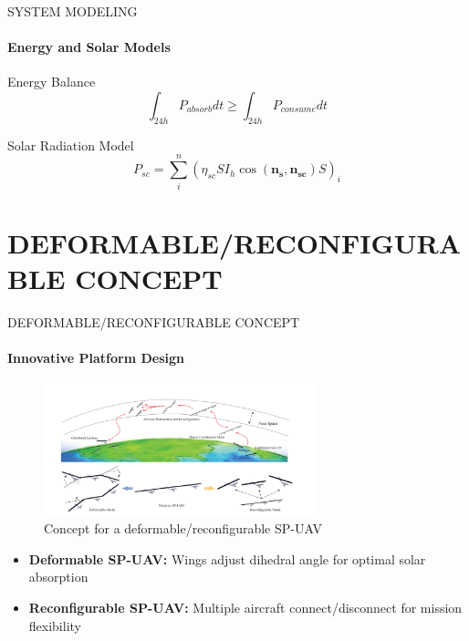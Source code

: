 \documentclass{beamer}
\begin{document}
\begin{frame}{SYSTEM MODELING}
    \framesubtitle{Energy and Solar Models}
    
    \begin{block}{Energy Balance}
    \begin{equation*}
        \int_{24h} P_{absorb}dt \geq \int_{24h} P_{consume}dt
    \end{equation*}
    \end{block}
    
    \begin{block}{Solar Radiation Model}
    \begin{equation*}
        P_{sc} = \sum_i^n (\eta_{sc} SI_h \cos(\mathbf{n_s}, \mathbf{n_{sc}}) S)_i
    \end{equation*}
    \end{block}
\end{frame}

\section{DEFORMABLE/RECONFIGURABLE CONCEPT}

\begin{frame}{DEFORMABLE/RECONFIGURABLE CONCEPT}
    \framesubtitle{Innovative Platform Design}
    \begin{figure}
        \centering
        \includegraphics[width=0.7\textwidth]{concept.png}
        \caption{Concept for a deformable/reconfigurable SP-UAV}
        \label{fig:deformable_concept}
    \end{figure}
    
    \begin{itemize}
        \item \textbf{Deformable SP-UAV:} Wings adjust dihedral angle for optimal solar absorption
        \item \textbf{Reconfigurable SP-UAV:} Multiple aircraft connect/disconnect for mission flexibility
    \end{itemize}
\end{frame}
\end{document}
